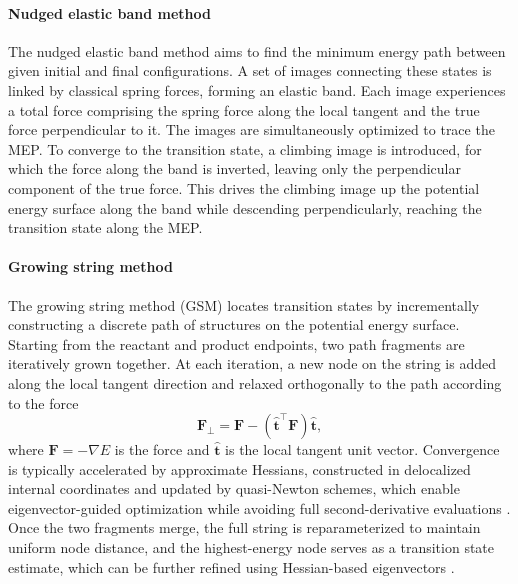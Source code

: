 \documentclass[pdflatex,sn-mathphys-num]{sn-jnl}%
\theoremstyle{thmstyleone}%
\theoremstyle{thmstyletwo}%
\theoremstyle{thmstylethree}%
\begin{document}
\begin{appendices}
\paragraph{Nudged elastic band method}
The nudged elastic band method aims to find the minimum energy path between given initial and final configurations. A set of images connecting these states is linked by classical spring forces, forming an elastic band. Each image experiences a total force comprising the spring force along the local tangent and the true force perpendicular to it. The images are simultaneously optimized to trace the MEP. To converge to the transition state, a climbing image is introduced, for which the force along the band is inverted, leaving only the perpendicular component of the true force. This drives the climbing image up the potential energy surface along the band while descending perpendicularly, reaching the transition state along the MEP.

\paragraph{Growing string method}
The growing string method (GSM) locates transition states by incrementally constructing a discrete path of structures on the potential energy surface. Starting from the reactant and product endpoints, two path fragments are iteratively grown together. At each iteration, a new node on the string is added along the local tangent direction and relaxed orthogonally to the path according to the force
\begin{equation}
\mathbf{F}_{\bot} = \mathbf{F} - (\hat{\mathbf{t}}^{\top} \mathbf{F}) \hat{\mathbf{t}},
\end{equation}
where $\mathbf{F} = -\nabla E$ is the force and $\hat{\mathbf{t}}$ is the local tangent unit vector. Convergence is typically accelerated by approximate Hessians, constructed in delocalized internal coordinates and updated by quasi-Newton schemes, which enable eigenvector-guided optimization while avoiding full second-derivative evaluations \citep{zimmerman2015}. Once the two fragments merge, the full string is reparameterized to maintain uniform node distance, and the highest-energy node serves as a transition state estimate, which can be further refined using Hessian-based eigenvectors \citep{peters2004}.


\end{appendices}
\end{document}
